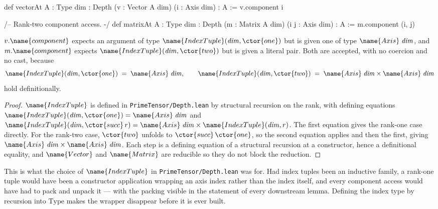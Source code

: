 \begin{leancode}
def vectorAt {A : Type} {dim : Depth} (v : Vector A dim) (i : Axis dim) : A :=
  v.component i

/-- Rank-two component access. -/
def matrixAt {A : Type} {dim : Depth} (m : Matrix A dim)
    (i j : Axis dim) : A :=
  m.component (i, j)
\end{leancode}

\begin{proposition}\label{Tensor:Basic:prop:defeq}
$v.\name{component}$ expects an argument of type
$\name{IndexTuple}(\mathit{dim}, \ctor{one})$ but is given one of type
$\name{Axis}\;\mathit{dim}$, and $m.\name{component}$ expects
$\name{IndexTuple}(\mathit{dim}, \ctor{two})$ but is given a literal pair.
Both are accepted, with no coercion and no cast, because
\[
  \name{IndexTuple}(\mathit{dim}, \ctor{one})
    \;=\; \name{Axis}\;\mathit{dim},
  \qquad
  \name{IndexTuple}(\mathit{dim}, \ctor{two})
    \;=\; \name{Axis}\;\mathit{dim} \times \name{Axis}\;\mathit{dim}
\]
hold definitionally.
\end{proposition}

\begin{proof}
$\name{IndexTuple}$ is defined in \texttt{PrimeTensor/Depth.lean} by
structural recursion on the rank, with defining equations
$\name{IndexTuple}(\mathit{dim}, \ctor{one}) = \name{Axis}\;\mathit{dim}$ and
$\name{IndexTuple}(\mathit{dim}, \ctor{succ}\,r) =
  \name{Axis}\;\mathit{dim} \times \name{IndexTuple}(\mathit{dim}, r)$.
The first equation gives the rank-one case directly.  For the rank-two case,
$\ctor{two}$ unfolds to $\ctor{succ}\,\ctor{one}$, so the second equation
applies and then the first, giving
$\name{Axis}\;\mathit{dim} \times \name{Axis}\;\mathit{dim}$.  Each step is a
defining equation of a structural recursion at a constructor, hence a
definitional equality, and $\name{Vector}$ and $\name{Matrix}$ are reducible
so they do not block the reduction.
\end{proof}

\begin{designnote}\label{Tensor:Basic:note:recursive-index}
This is what the choice of $\name{IndexTuple}$ in
\texttt{PrimeTensor/Depth.lean} was for.  Had index tuples been an inductive
family, a rank-one tuple would have been a constructor application wrapping an
axis index rather than the index itself, and every component access would have
had to pack and unpack it --- with the packing visible in the statement of
every downstream lemma.  Defining the index type by recursion into
$\mathrm{Type}$ makes the wrapper disappear before it is ever built.
\end{designnote}

